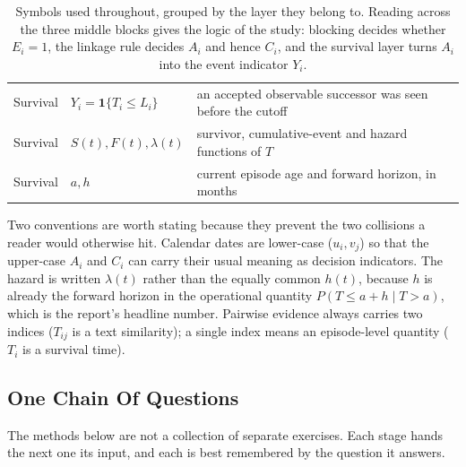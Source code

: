 \documentclass[11pt,a4paper]{article}
\begin{document}
\begin{table}[H]
\begin{tabularx}{\textwidth}{llX}
Survival  & \(Y_i=\mathbf{1}\{T_i\le L_i\}\) & an accepted observable successor was seen before the cutoff \\
Survival  & \(S(t), F(t), \lambda(t)\) & survivor, cumulative-event and hazard functions of \(T\) \\
Survival  & \(a, h\)               & current episode age and forward horizon, in months \\
\bottomrule
\end{tabularx}
\caption{Symbols used throughout, grouped by the layer they belong to. Reading
across the three middle blocks gives the logic of the study: blocking decides
whether \(E_i=1\), the linkage rule decides \(A_i\) and hence \(C_i\), and the
survival layer turns \(A_i\) into the event indicator \(Y_i\).}
\end{table}

Two conventions are worth stating because they prevent the two collisions a
reader would otherwise hit. Calendar dates are lower-case (\(u_i, v_j\)) so that
the upper-case \(A_i\) and \(C_i\) can carry their usual meaning as decision
indicators. The hazard is written \(\lambda(t)\) rather than the equally common
\(h(t)\), because \(h\) is already the forward horizon in the operational
quantity \(P(T\le a+h\mid T>a)\), which is the report's headline number. Pairwise
evidence always carries two indices (\(T_{ij}\) is a text similarity); a single
index means an episode-level quantity (\(T_i\) is a survival time).

\subsection{One Chain Of Questions}
The methods below are not a collection of separate exercises. Each stage hands
the next one its input, and each is best remembered by the question it answers.
\end{document}
